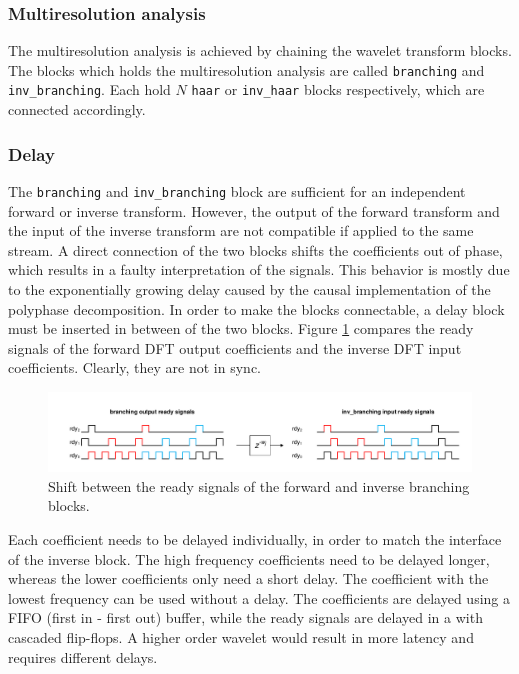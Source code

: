 \begin{refsection}
\subsubsection{Multiresolution analysis}

The multiresolution analysis is achieved by chaining the wavelet transform blocks.
The blocks which holds the multiresolution analysis are called \texttt{branching} and \texttt{inv\_branching}.
Each hold $N$ \texttt{haar} or \texttt{inv\_haar} blocks respectively, which are connected accordingly.

\subsubsection{Delay \label{fpga:sec:delay}}

The \texttt{branching} and \texttt{inv\_branching} block are sufficient for an independent forward or inverse transform.
However, the output of the forward transform and the input of the inverse transform are not compatible if applied to the same stream.
A direct connection of the two blocks shifts the coefficients out of phase, which results in a faulty interpretation of the signals.
This behavior is mostly due to the exponentially growing delay caused by the causal implementation of the polyphase decomposition.
In order to make the blocks connectable, a delay block must be inserted in between of the two blocks.
Figure \ref{fpga:fig:delay} compares the ready signals of the forward DFT output coefficients and the inverse DFT input coefficients.
Clearly, they are not in sync.
\begin{figure}
	\centering
	\includegraphics[width=\textwidth]{papers/fpga/images/delay.pdf}
	\caption{
		Shift between the ready signals of the forward and inverse branching blocks.
	}
	\label{fpga:fig:delay}
\end{figure}
Each coefficient needs to be delayed individually, in order to match the interface of the inverse block.
The high frequency coefficients need to be delayed longer, whereas the lower coefficients only need a short delay.
The coefficient with the lowest frequency can be used without a delay.
The coefficients are delayed using a FIFO (first in - first out) buffer, while the ready signals are delayed in a with cascaded flip-flops.
A higher order wavelet would result in more latency and requires different delays. 


\end{refsection}
